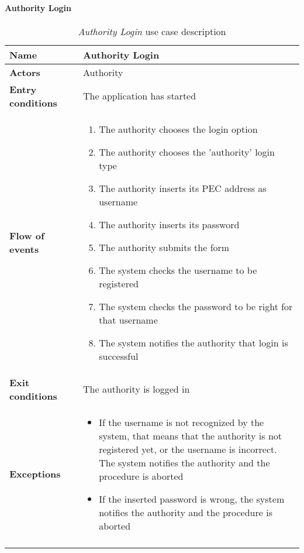 		\paragraph{Authority Login}
			\begin{longtable}{p{0.25\linewidth}p{0.75\linewidth}}
				\toprule
				\textbf{Name} & \textbf{Authority Login} \\
				\midrule
				\textbf{Actors} & Authority\\
				\midrule
				\textbf{Entry conditions} & The application has started \\
				\midrule
				\textbf{Flow of events} & 
				\begin{enumerate}
					\item The authority chooses the login option
					\item The authority chooses the 'authority' login type
					\item The authority inserts its PEC address as username
					\item The authority inserts its password
					\item The authority submits the form
					\item The system checks the username to be registered
					\item The system checks the password to be right for that username
					\item The system notifies the authority that login is successful
				\end{enumerate} \\
				\midrule
				\textbf{Exit conditions} & The authority is logged in\\
				\midrule
				\textbf{Exceptions} & 
				\begin{itemize}
					\item If the username is not recognized by the system, that means that the authority is not registered yet, or the username is incorrect. The system notifies the authority and the procedure is aborted
					\item If the inserted password is wrong, the system notifies the authority and the procedure is aborted			
				\end{itemize} \\
				\bottomrule
				\caption{\emph{Authority Login} use case description}
			\end{longtable}
		
